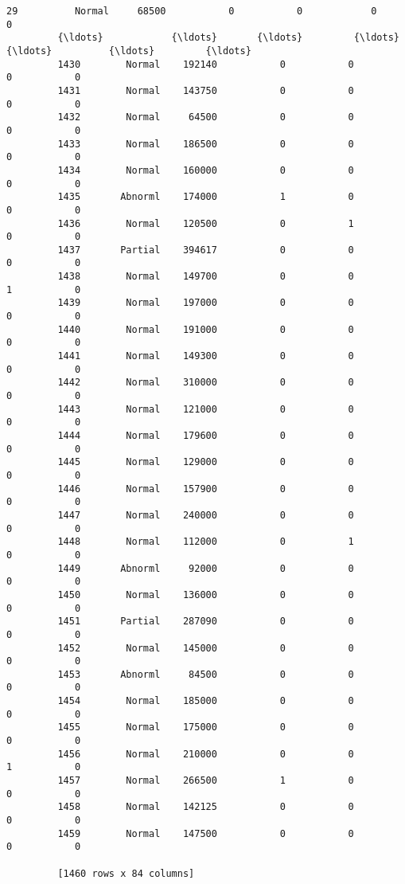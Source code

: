 \documentclass[11pt]{article}
\begin{document}
\begin{Verbatim}[commandchars=\\\{\}]
         29          Normal     68500           0           0            0           0  
         {\ldots}            {\ldots}       {\ldots}         {\ldots}         {\ldots}          {\ldots}         {\ldots}  
         1430        Normal    192140           0           0            0           0  
         1431        Normal    143750           0           0            0           0  
         1432        Normal     64500           0           0            0           0  
         1433        Normal    186500           0           0            0           0  
         1434        Normal    160000           0           0            0           0  
         1435       Abnorml    174000           1           0            0           0  
         1436        Normal    120500           0           1            0           0  
         1437       Partial    394617           0           0            0           0  
         1438        Normal    149700           0           0            1           0  
         1439        Normal    197000           0           0            0           0  
         1440        Normal    191000           0           0            0           0  
         1441        Normal    149300           0           0            0           0  
         1442        Normal    310000           0           0            0           0  
         1443        Normal    121000           0           0            0           0  
         1444        Normal    179600           0           0            0           0  
         1445        Normal    129000           0           0            0           0  
         1446        Normal    157900           0           0            0           0  
         1447        Normal    240000           0           0            0           0  
         1448        Normal    112000           0           1            0           0  
         1449       Abnorml     92000           0           0            0           0  
         1450        Normal    136000           0           0            0           0  
         1451       Partial    287090           0           0            0           0  
         1452        Normal    145000           0           0            0           0  
         1453       Abnorml     84500           0           0            0           0  
         1454        Normal    185000           0           0            0           0  
         1455        Normal    175000           0           0            0           0  
         1456        Normal    210000           0           0            1           0  
         1457        Normal    266500           1           0            0           0  
         1458        Normal    142125           0           0            0           0  
         1459        Normal    147500           0           0            0           0  
         
         [1460 rows x 84 columns]
\end{Verbatim}
            
\end{document}
